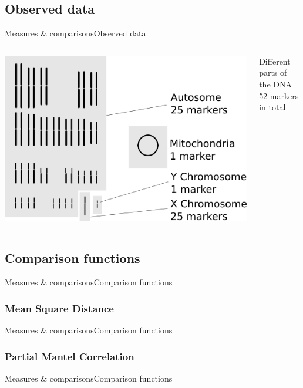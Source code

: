 \documentclass[10pt,aspectratio=43]{beamer}
\begin{document}
\subsection{Observed data}
\begin{frame}{Measures \& comparisons}{Observed data}
\begin{columns}
  \includegraphics[width=1\textwidth]{../data/markers.png}

  Different parts of the DNA\\
  52 markers in total

\end{columns}
\end{frame}

\subsection{Comparison functions}
\begin{frame}{Measures \& comparisons}{Comparison functions}
\end{frame}

\subsubsection{Mean Square Distance}
\begin{frame}{Measures \& comparisons}{Comparison functions}
\end{frame}

\subsubsection{Partial Mantel Correlation}
\begin{frame}{Measures \& comparisons}{Comparison functions}
\end{frame}
\end{document}
